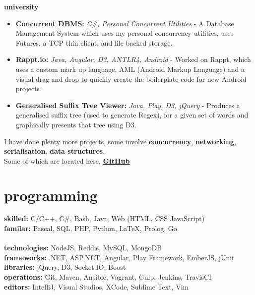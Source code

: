 \documentclass[]{friggeri-cv} %
\begin{document}
{
  \large\textbf{university}
}
\begin{itemize}
    \item \textbf{Concurrent DBMS:} \emph{C\#, Personal Concurrent Utilities} -
        A Database Management System which uses my personal concurrency utilities,
        uses Futures, a TCP thin client, and file backed storage.
    \item \textbf{Rappt.io:} \emph{Java, Angular, D3, ANTLR4, Android} -
        Worked on Rappt, which uses a custom mark up language, AML (Android Markup Language)
          and a visual drag and drop to quickly create the boilerplate code for new Android projects.
    \item \textbf{Generalised Suffix Tree Viewer:} \emph{Java, Play, D3, jQuery} -
        Produces a generalised suffix tree (used to generate Regex), for a given set of words and graphically
          presents that tree using D3.
\end{itemize}

I have done plenty more projects, some involve \textbf{concurrency}, \textbf{networking}, \textbf{serialisation}, \textbf{data structures}. \\
Some of which are located here, \underline{\textbf{\href{http://github.com/Compulsed/}{GitHub}}} \\


\section{programming}
    \textbf{skilled:} C/C++, C\#, Bash, Java, Web (HTML, CSS JavaScript) \\
    \textbf{familar:} Pascal, SQL, PHP, Python, LaTeX, Prolog, Go \\
    \\
    \textbf{technologies:} NodeJS, Reddis, MySQL, MongoDB \\
    \textbf{frameworks:} .NET, ASP.NET, Angular, Play Framework, EmberJS, jUnit \\
    \textbf{libraries:} jQuery, D3, Socket.IO, Boost \\
    \textbf{operations:} Git, Maven, Ansible, Vagrant, Gulp, Jenkins, TravisCI \\
    \textbf{editors:} IntelliJ, Visual Studios, XCode, Sublime Text, Vim \\
\end{document}
